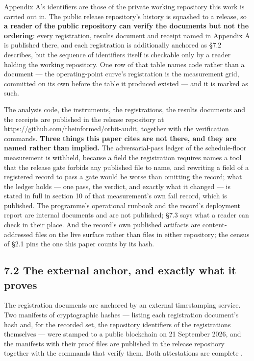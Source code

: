 \documentclass[11pt]{article}
\begin{document}
Appendix A's identifiers are those of the private working repository this work is carried out in. The public release repository's history is squashed to a release, so \textbf{a reader of the public repository can verify the documents but not the ordering}: every registration, results document and receipt named in Appendix A is published there, and each registration is additionally anchored as \S{}7.2 describes, but the sequence of identifiers itself is checkable only by a reader holding the working repository. One row of that table names code rather than a document --- the operating-point curve's registration is the measurement grid, committed on its own before the table it produced existed --- and it is marked as such.

The analysis code, the instruments, the registrations, the results documents and the receipts are published in the release repository at \url{https://github.com/theinformed/orbit-audit}, together with the verification commands. \textbf{Three things this paper cites are not there, and they are named rather than implied.} The adversarial-pass ledger of the schedule-floor measurement is withheld, because a field the registration requires names a tool that the release gate forbids any published file to name, and rewriting a field of a registered record to pass a gate would be worse than omitting the record; what the ledger holds --- one pass, the verdict, and exactly what it changed --- is stated in full in section 10 of that measurement's own fail record, which is published. The programme's operational runbook and the record's deployment report are internal documents and are not published; \S{}7.3 says what a reader can check in their place. And the record's own published artifacts are content-addressed files on the live surface rather than files in either repository; the census of \S{}2.1 pins the one this paper counts by its hash.

\subsection*{7.2 The external anchor, and exactly what it proves}

The registration documents are anchored by an external timestamping service. Two manifests of cryptographic hashes --- listing each registration document's hash and, for the recorded set, the repository identifiers of the registrations themselves --- were stamped to a public blockchain on 21 September 2026, and the manifests with their proof files are published in the release repository together with the commands that verify them. Both attestations are complete%
.
\end{document}
